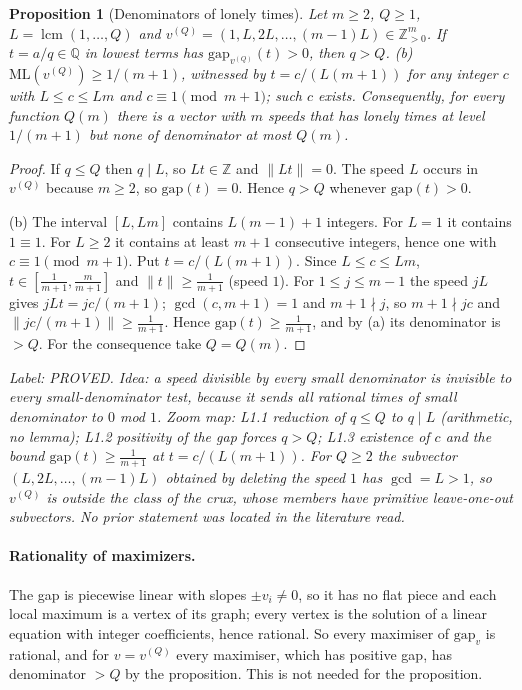 \documentclass[11pt]{article}
\newtheorem{proposition}[theorem]{Proposition}
\theoremstyle{remark}
\newcommand{\norm}[1]{\lVert #1\rVert}
\newcommand{\ML}{\mathrm{ML}}
\newcommand{\gap}{\mathrm{gap}}
\newcommand{\Z}{\mathbb{Z}}
\newcommand{\lab}[1]{\par\smallskip\noindent\textit{Label: #1.}}
\begin{document}
\begin{proposition}[Denominators of lonely times]\label{prop:growth}
Let $m\ge2$, $Q\ge1$, $L=\operatorname{lcm}(1,\dots,Q)$ and $v^{(Q)}=(1,L,2L,\dots,(m-1)L)\in\Z_{>0}^m$. If $t=a/q\in\mathbb Q$ in lowest terms has $\gap_{v^{(Q)}}(t)>0$, then $q>Q$. (b) $\ML(v^{(Q)})\ge1/(m+1)$, witnessed by $t=c/(L(m+1))$ for any integer $c$ with $L\le c\le Lm$ and $c\equiv1\pmod{m+1}$; such $c$ exists. Consequently, for every function $Q(m)$ there is a vector with $m$ speeds that has lonely times at level $1/(m+1)$ but none of denominator at most $Q(m)$.
\end{proposition}
\begin{proof}
If $q\le Q$ then $q\mid L$, so $Lt\in\Z$ and $\norm{Lt}=0$. The speed $L$ occurs in $v^{(Q)}$ because $m\ge2$, so $\gap(t)=0$. Hence $q>Q$ whenever $\gap(t)>0$.

(b) The interval $[L,Lm]$ contains $L(m-1)+1$ integers. For $L=1$ it contains $1\equiv1$. For $L\ge2$ it contains at least $m+1$ consecutive integers, hence one with $c\equiv1\pmod{m+1}$. Put $t=c/(L(m+1))$. Since $L\le c\le Lm$, $t\in[\frac1{m+1},\frac m{m+1}]$ and $\norm{t}\ge\frac1{m+1}$ (speed $1$). For $1\le j\le m-1$ the speed $jL$ gives $jLt=jc/(m+1)$; $\gcd(c,m+1)=1$ and $m+1\nmid j$, so $m+1\nmid jc$ and $\norm{jc/(m+1)}\ge\frac1{m+1}$. Hence $\gap(t)\ge\frac1{m+1}$, and by (a) its denominator is $>Q$. For the consequence take $Q=Q(m)$.
\end{proof}
\lab{PROVED. Idea: a speed divisible by every small denominator is invisible to every small-denominator test, because it sends all rational times of small denominator to $0$ mod $1$. Zoom map: L1.1 reduction of $q\le Q$ to $q\mid L$ (arithmetic, no lemma); L1.2 positivity of the gap forces $q>Q$; L1.3 existence of $c$ and the bound $\gap(t)\ge\frac1{m+1}$ at $t=c/(L(m+1))$. For $Q\ge2$ the subvector $(L,2L,\dots,(m-1)L)$ obtained by deleting the speed $1$ has $\gcd=L>1$, so $v^{(Q)}$ is outside the class of the crux, whose members have primitive leave-one-out subvectors. No prior statement was located in the literature read}

\paragraph{Rationality of maximizers.}
The gap is piecewise linear with slopes $\pm v_i\ne0$, so it has no flat piece and each local maximum is a vertex of its graph; every vertex is the solution of a linear equation with integer coefficients, hence rational. So every maximiser of $\gap_v$ is rational, and for $v=v^{(Q)}$ every maximiser, which has positive gap, has denominator $>Q$ by the proposition. This is not needed for the proposition.
\end{document}
